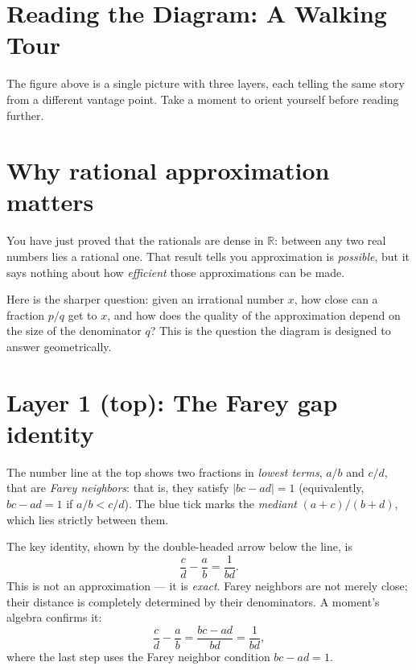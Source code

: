 


\section*{Reading the Diagram: A Walking Tour}

The figure above is a single picture with three layers, each telling
the same story from a different vantage point.
Take a moment to orient yourself before reading further.

\bigskip

\section*{Why rational approximation matters}

You have just proved that the rationals are dense in $\mathbb{R}$:
between any two real numbers lies a rational one.
That result tells you approximation is \emph{possible}, but it says
nothing about how \emph{efficient} those approximations can be made.

Here is the sharper question: given an irrational number $x$, how
close can a fraction $p/q$ get to $x$, and how does the quality of
the approximation depend on the size of the denominator $q$?
This is the question the diagram is designed to answer geometrically.

\bigskip

\section*{Layer 1 (top): The Farey gap identity}

The number line at the top shows two fractions in \emph{lowest terms},
$a/b$ and $c/d$, that are \emph{Farey neighbors}: that is, they satisfy
$|bc - ad| = 1$ (equivalently, $bc - ad = 1$ if $a/b < c/d$).
The blue tick marks the \emph{mediant} $(a+c)/(b+d)$, which lies
strictly between them.

\medskip

The key identity, shown by the double-headed arrow below the line, is
\[
\frac{c}{d} - \frac{a}{b} = \frac{1}{bd}.
\]
This is not an approximation --- it is \emph{exact}.
Farey neighbors are not merely close; their distance is completely
determined by their denominators.
A moment's algebra confirms it:
\[
\frac{c}{d} - \frac{a}{b}
= \frac{bc - ad}{bd}
= \frac{1}{bd},
\]
where the last step uses the Farey neighbor condition $bc - ad = 1$.

